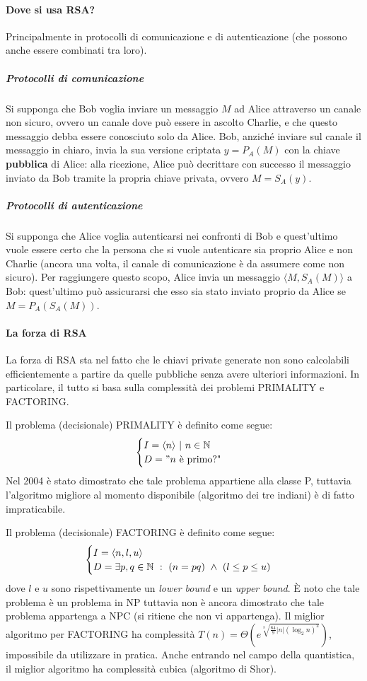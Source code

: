 \paragraph{Dove si usa RSA?}
Principalmente in protocolli di comunicazione e di autenticazione (che possono anche essere combinati tra loro).
\subparagraph{Protocolli di comunicazione} Si supponga che Bob voglia inviare un messaggio $M$ ad Alice attraverso un canale non sicuro, ovvero un canale dove può essere in ascolto Charlie, e che questo messaggio debba essere conosciuto solo da Alice. Bob, anziché inviare sul canale il messaggio in chiaro, invia la sua versione criptata $y=P_A(M)$ con la chiave \textbf{pubblica} di Alice: alla ricezione, Alice può decrittare con successo il messaggio inviato da Bob tramite la propria chiave privata, ovvero $M=S_A(y)$.

\subparagraph{Protocolli di autenticazione} Si supponga che Alice voglia autenticarsi nei confronti di Bob e quest'ultimo vuole essere certo che la persona che si vuole autenticare sia proprio Alice e non Charlie (ancora una volta, il canale di comunicazione è da assumere come non sicuro). Per raggiungere questo scopo, Alice invia un messaggio $\langle M, S_A(M)\rangle$ a Bob: quest'ultimo può assicurarsi che esso sia stato inviato proprio da Alice se $M=P_A(S_A(M))$.

\paragraph{La forza di RSA}
La forza di RSA sta nel fatto che le chiavi private generate non sono calcolabili efficientemente a partire da quelle pubbliche senza avere ulteriori informazioni. In particolare, il tutto si basa sulla complessità dei problemi PRIMALITY e FACTORING.

Il problema (decisionale) PRIMALITY è definito come segue:
\[
\begin{cases}
I= \langle n \rangle\ |\ n\in\operatorname*{\mathbb{N}} \\
D= "n\text{ è primo?"}
\end{cases}
\]
Nel 2004 è stato dimostrato che tale problema appartiene alla classe P, tuttavia l'algoritmo migliore al momento disponibile (algoritmo dei tre indiani) è di fatto impraticabile.

Il problema (decisionale) FACTORING è definito come segue:
\[
\begin{cases}
I= \langle n,l,u \rangle \\
D= \exists p,q\in\operatorname*{\mathbb{N}}\ :\ (n=pq)\ \land\ (l\leq p\leq u)
\end{cases}
\]
dove $l$ e $u$ sono rispettivamente un \textit{lower bound} e un \textit{upper bound}. È noto che tale problema è un problema in NP tuttavia non è ancora dimostrato che tale problema appartenga a NPC (si ritiene che non vi appartenga). Il miglior algoritmo per FACTORING ha complessità $T(n)=\Theta(e^{\sqrt[3]{\frac{64}{9}|n|(\log_2 n)^2}})$, impossibile da utilizzare in pratica. Anche entrando nel campo della quantistica, il miglior algoritmo ha complessità cubica (algoritmo di Shor).

